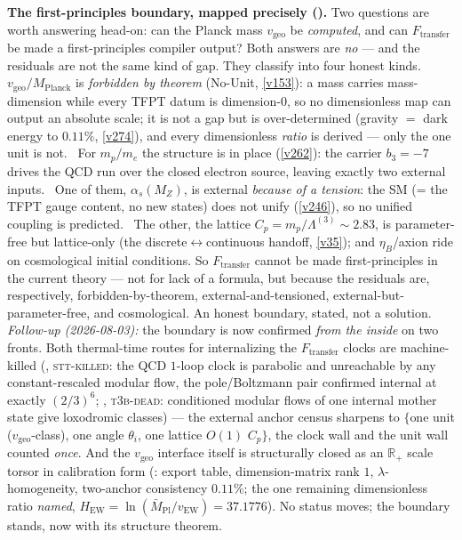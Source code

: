 \documentclass[11pt,a4paper]{article}
\begin{document}
\par\smallskip\noindent\textbf{The first-principles boundary, mapped precisely ().}
Two questions are worth answering head-on: can the Planck mass $v_{\mathrm{geo}}$ be \emph{computed}, and can
$F_{\mathrm{transfer}}$ be made a first-principles compiler output? Both answers are \emph{no} --- and the
residuals are not the same kind of gap. They classify into four honest kinds. \mE\ $v_{\mathrm{geo}}/M_{\mathrm{Planck}}$
is \emph{forbidden by theorem} (No-Unit, \vref{v153}): a mass carries mass-dimension while every TFPT datum is
dimension-$0$, so no dimensionless map can output an absolute scale; it is not a gap but is over-determined (gravity
$=$ dark energy to $0.11\%$, \vref{v274}), and every dimensionless \emph{ratio} is derived --- only the one unit is
not. \mE\ For $m_p/m_e$ the structure is in place (\vref{v262}): the carrier $b_3{=}{-}7$ drives the QCD run over the
closed electron source, leaving exactly two external inputs. \mX\ One of them, $\alpha_s(M_Z)$, is external
\emph{because of a tension}: the SM (= the TFPT gauge content, no new states) does not unify (\vref{v246}), so no
unified coupling is predicted. \mC\ The other, the lattice $C_p=m_p/\Lambda^{(3)}\!\sim\!2.83$, is parameter-free
but lattice-only (the discrete$\leftrightarrow$continuous handoff, \vref{v35}); and $\eta_B$/axion ride on
cosmological initial conditions. So $F_{\mathrm{transfer}}$ cannot be made first-principles in the current theory ---
not for lack of a formula, but because the residuals are, respectively, forbidden-by-theorem, external-and-tensioned,
external-but-parameter-free, and cosmological. An honest boundary, stated, not a solution.
\emph{Follow-up (2026-08-03):} the boundary is now confirmed \emph{from the inside} on two fronts.  Both
thermal-time routes for internalizing the $F_{\mathrm{transfer}}$ clocks are machine-killed
(, \textsc{stt-killed}: the QCD $1$-loop clock is parabolic and
unreachable by any constant-rescaled modular flow, the pole/Boltzmann pair confirmed internal at exactly
$(2/3)^6$; , \textsc{t3b-dead}: conditioned modular flows of one
internal mother state give loxodromic classes) --- the external anchor census sharpens to $\{$one unit
($v_{\mathrm{geo}}$-class), one angle $\theta_i$, one lattice $O(1)$ $C_p\}$, the clock wall and the unit
wall counted \emph{once}.  And the $v_{\mathrm{geo}}$ interface itself is structurally closed as an
$\mathbb R_+$ scale torsor in calibration form (: export table,
dimension-matrix rank $1$, $\lambda$-homogeneity, two-anchor consistency $0.11\%$; the one remaining
dimensionless ratio \emph{named}, $H_{\mathrm{EW}}=\ln(\bar M_{\mathrm{Pl}}/v_{\mathrm{EW}})=37.1776$).  No status moves;
the boundary stands, now with its structure theorem.
\end{document}

